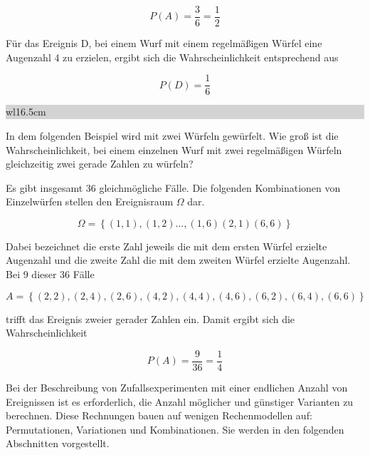 \begin{equation}\label{eq:twoeightteen}
P(A)=\dfrac{3}{6} =\dfrac{1}{2}
\end{equation}

\noindent F\"{u}r das Ereignis D, bei einem Wurf mit einem regelm\"{a}{\ss}igen W\"{u}rfel eine Augenzahl 4 zu erzielen, ergibt sich die Wahrscheinlichkeit entsprechend aus

\begin{equation}\label{eq:twonineteen}
P(D)=\dfrac{1}{6}
\end{equation}

\noindent
\colorbox{lightgray}{%
%
\renewcommand\arraystretch{0.6}%
\begin{tabular}{ wl{16.5cm} }
{\selectfont
{}}
\end{tabular}%
}\bigskip


\noindent In dem folgenden Beispiel wird mit zwei W\"{u}rfeln gew\"{u}rfelt. Wie gro{\ss} ist die Wahrscheinlichkeit, bei einem einzelnen Wurf mit zwei regelm\"{a}{\ss}igen W\"{u}rfeln gleichzeitig zwei gerade Zahlen zu w\"{u}rfeln? \newline

\noindent Es gibt insgesamt 36 gleichm\"{o}gliche F\"{a}lle. Die folgenden Kombinationen von Einzelw\"{u}rfen stellen den Ereignisraum $\Omega$ dar.

\begin{equation}\label{eq:twotwenty}
\Omega =\left\{(1,1) ,(1,2) ...,( 1,6)(2,1)(6,6)\right\}
\end{equation}

\noindent Dabei bezeichnet die erste Zahl jeweils die mit dem ersten W\"{u}rfel erzielte Augenzahl und die zweite Zahl die mit dem zweiten W\"{u}rfel erzielte Augenzahl. Bei 9 dieser 36 F\"{a}lle

\begin{equation}\label{eq:twotwentyone}
A=\left\{(2,2),(2,4),(2,6),(4,2),(4,4),(4,6),(6,2),(6,4),(6,6)\right\}
\end{equation}

\noindent trifft das Ereignis zweier gerader Zahlen ein. Damit ergibt sich die Wahrscheinlichkeit

\begin{equation}\label{eq:twotwentytwo}
P(A)=\dfrac{9}{36} =\dfrac{1}{4}
\end{equation}

\noindent Bei der Beschreibung von Zufallsexperimenten mit einer endlichen Anzahl von Ereignissen ist es erforderlich, die Anzahl m\"{o}glicher und g\"{u}nstiger Varianten zu berechnen. Diese Rechnungen bauen auf wenigen Rechenmodellen auf: Permutationen, Variationen und Kombinationen. Sie werden in den folgenden Abschnitten vorgestellt.

